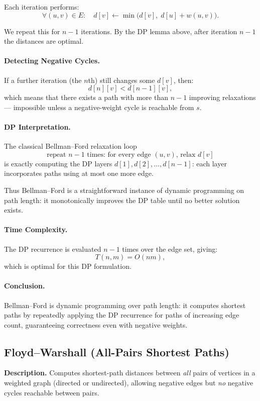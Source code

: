 \documentclass[9pt]{extarticle}
\begin{document}
Each iteration performs:
\[
  \forall (u,v)\in E:
    \quad d[v] \gets \min\big( d[v],\; d[u] + w(u,v) \big).
\]

We repeat this for $n-1$ iterations.  
By the DP lemma above, after iteration $n-1$ the distances are optimal.

\paragraph{Detecting Negative Cycles.}
If a further iteration (the $n$th) still changes some $d[v]$, then:
\[
  d[n][v] < d[n-1][v],
\]
which means that there exists a path with more than $n-1$ improving relaxations—  
impossible unless a negative-weight cycle is reachable from $s$.

\paragraph{DP Interpretation.}
The classical Bellman--Ford relaxation loop
\[
  \text{repeat $n-1$ times: for every edge $(u,v)$, relax $d[v]$}
\]
is exactly computing the DP layers $d[1], d[2], \dots, d[n-1]$:
each layer incorporates paths using at most one more edge.

Thus Bellman--Ford is a straightforward instance of dynamic programming on path length:
it monotonically improves the DP table until no better solution exists.

\paragraph{Time Complexity.}
The DP recurrence is evaluated $n-1$ times over the edge set, giving:
\[
  T(n,m) = O(nm),
\]
which is optimal for this DP formulation.

\paragraph{Conclusion.}
Bellman--Ford is dynamic programming over path length:  
it computes shortest paths by repeatedly applying the DP recurrence for paths
of increasing edge count, guaranteeing correctness even with negative weights.

\subsection{Floyd--Warshall (All-Pairs Shortest Paths)}
\textbf{Description.} Computes shortest-path distances between \emph{all} pairs of vertices
in a weighted graph (directed or undirected), allowing negative edges but \emph{no}
negative cycles reachable between pairs.
\end{document}
